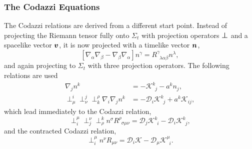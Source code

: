 \subsubsection{The Codazzi Equations}
The Codazzi relations are derived from a different start point. Instead of projecting the Riemann tensor fully onto $\Sigma_t$ with projection operators $\boldsymbol{\perp}$ and a spacelike vector $\boldsymbol{v}$, it is now projected with a timelike vector $\boldsymbol{n}$,
\begin{equation}\label{nr:eq:Riem(n)}  [\nabla_\alpha\nabla_\beta-\nabla_\beta\nabla_\alpha]n^\gamma = {R}^\gamma_{\,\,\,\lambda \alpha\beta}n^\lambda ,\end{equation}
and again projecting to $\Sigma_t$ with three projection operators. The following relations are used
\begin{align}
\nabla_ j  n^ k  &= -\mathcal{K}^ k _{\,\,\, j } - a^ k  n_ j ,\\
 \perp^ i _\mu \perp^ j _\nu \perp^\rho_ k  \nabla_ i  \nabla_ j  n^ k  &= -\mathcal{D}_ i  \mathcal{K}^ k _{\,\,\, j } + a^ k  \mathcal{K}_{ i  j },
 \end{align}
which lead immediately to the Codazzi relation,
\begin{equation}\perp_ i ^\mu \perp_ j ^\nu \perp^ k _\rho n^\sigma R^\rho_{\,\,\,\sigma\mu\nu} =  \mathcal{D}_ j  \mathcal{K}^ k _{\,\,\, i } -\mathcal{D}_ i  \mathcal{K}^ k _{\,\,\, j },\end{equation}
and the contracted Codazzi relation,
\begin{equation}\perp^\mu_ i   n^\nu R_{\mu\nu} =  \mathcal{D}_ i  \mathcal{K} -\mathcal{D}_\mu \mathcal{K}^\mu_{\,\,\, i }.\end{equation}

